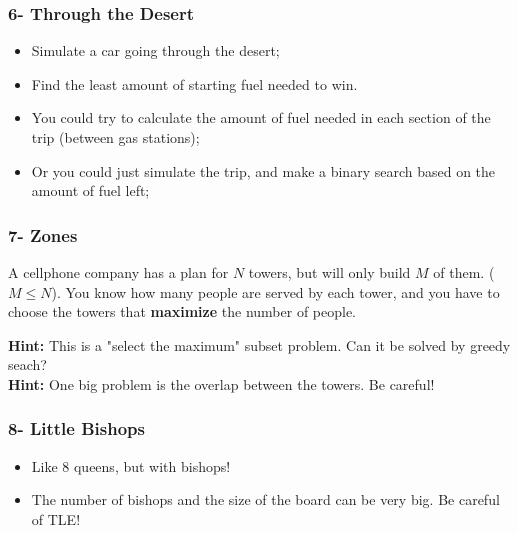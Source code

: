 \begin{frame}
  \frametitle{6- Through the Desert}
  {\small
    \begin{block}{}
      \begin{itemize}
      \item Simulate a car going through the desert;
      \item Find the least amount of starting fuel needed to win.
      \end{itemize}
    \end{block}

    \begin{itemize}
    \item You could try to calculate the amount of fuel needed in each
      section of the trip (between gas stations);
    \item Or you could just simulate the trip, and make a binary
      search based on the amount of fuel left;
    \end{itemize}
  }
\end{frame}

\begin{frame}
  \frametitle{7- Zones}
  A cellphone company has a plan for $N$ towers, but will only build $M$ of them. ($M \leq N$). You know how many people are served by each tower, and you have to choose the towers that {\bf maximize} the number of people.\bigskip

  {\bf Hint:} This is a "select the maximum" subset problem. Can it be solved by greedy seach?\\
  {\bf Hint:} One big problem is the overlap between the towers. Be careful!
\end{frame}

\begin{frame}
  \frametitle{8- Little Bishops}

  \begin{itemize}
    \item Like 8 queens, but with bishops!
    \item The number of bishops and the size of the board can be very big. Be careful of TLE!
  \end{itemize}
\end{frame}
